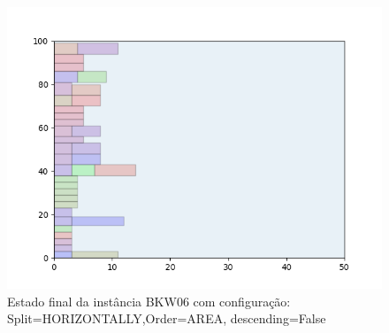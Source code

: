 \begin{figure}[H]
    \centering
    \caption[]{Estado final da instância BKW06 com configuração: Split=HORIZONTALLY,Order=AREA, descending=False}
    \label{fig:bkw06-horizontally-area-false}
    \includegraphics[scale=0.5]{output/figures/bkw/bkw06/horizontally/area/false/00}
\end{figure}